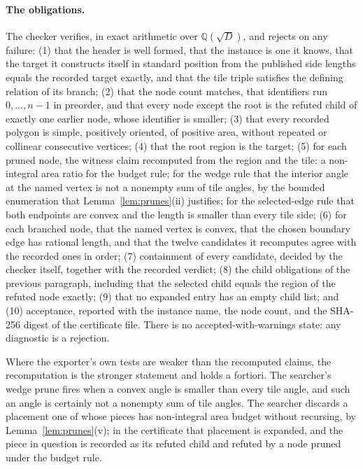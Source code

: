 \documentclass[11pt]{amsart}
\theoremstyle{definition}
\theoremstyle{remark}
\newcommand{\Q}{\mathbb Q}
\begin{document}
\paragraph{The obligations.}
The checker verifies, in exact arithmetic over $\Q(\sqrt D)$, and rejects on
any failure: (1) that the header is well formed, that the instance is one it
knows, that the target it constructs itself in standard position from the
published side lengths equals the recorded target exactly, and that the tile
triple satisfies the defining relation of its branch; (2) that the node count
matches, that identifiers run $0,\dots,n-1$ in preorder, and that every node
except the root is the refuted child of exactly one earlier node, whose
identifier is smaller; (3) that every recorded polygon is simple, positively
oriented, of positive area, without repeated or collinear consecutive
vertices; (4) that the root region is the target; (5) for each pruned node,
the witness claim recomputed from the region and the tile: a non-integral
area ratio for the budget rule; for the wedge rule that the interior angle at
the named vertex is not a nonempty sum of tile angles, by the bounded
enumeration that Lemma~\ref{lem:prunes}(ii) justifies; for the selected-edge
rule that both endpoints are convex and the length is smaller than every tile
side; (6) for each branched node, that the named vertex is convex, that the
chosen boundary edge has rational length, and that the twelve candidates it
recomputes agree with the recorded ones in order; (7) containment of every
candidate, decided by the checker itself, together with the recorded verdict;
(8) the child obligations of the previous paragraph, including that the
selected child equals the region of the refuted node exactly; (9) that no
expanded entry has an empty child list; and (10) acceptance, reported with
the instance name, the node count, and the SHA-256 digest of the certificate
file.  There is no accepted-with-warnings state: any diagnostic is a
rejection.

Where the exporter's own tests are weaker than the recomputed claims, the
recomputation is the stronger statement and holds a fortiori.  The searcher's
wedge prune fires when a convex angle is smaller than every tile angle, and
such an angle is certainly not a nonempty sum of tile angles.  The searcher
discards a placement one of whose pieces has non-integral area budget without
recursing, by Lemma~\ref{lem:prunes}(v); in the certificate that placement is
expanded, and the piece in question is recorded as its refuted child and
refuted by a node pruned under the budget rule.
\end{document}
